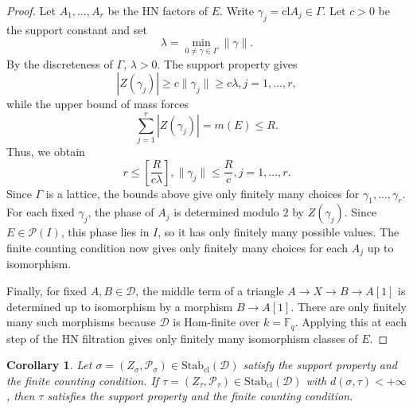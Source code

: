 \documentclass[a4paper,12pt]{amsart}
\numberwithin{equation}{section}
\newtheorem{corollary}[theorem]{Corollary}
\newcommand{\Stab}{\mathrm{Stab}}
\newcommand{\cl}{\mathrm{cl}}
\newcommand{\1}{\mathbf{1}}
\begin{document}
\begin{proof}
    Let $A_1,\dots,A_r$ be the HN factors of $E$. Write $\gamma_j=\cl A_j\in\Gamma$. Let $c>0$ be the support constant and set
    \[\lambda=\min_{0\neq\gamma\in\Gamma}\|\gamma\|.\]
    By the discreteness of $\Gamma$, $\lambda>0$. The support property gives
    \[|Z(\gamma_j)|\geqslant c\|\gamma_j\|\geqslant c\lambda,j=1,\dots,r,\]
    while the upper bound of mass forces
    \[\sum_{j=1}^r|Z(\gamma_j)|=m(E)\leqslant R.\]
    Thus, we obtain
    \[r\leqslant\left[\dfrac{R}{c\lambda}\right],\|\gamma_j\|\leqslant\dfrac{R}{c},j=1,\dots,r.\]
    Since $\Gamma$ is a lattice, the bounds above give only finitely many choices for $\gamma_1,\dots,\gamma_r$. For each fixed $\gamma_j$, the phase of $A_j$ is determined modulo $2$ by $Z(\gamma_j)$. Since $E\in\mathcal{P}(I)$, this phase lies in $I$, so it has only finitely many possible values. The finite counting condition now gives only finitely many choices for each $A_j$ up to isomorphism. 
    
    Finally, for fixed $A,B\in\mathcal{D}$, the middle term of a triangle $A\rightarrow X\rightarrow B\rightarrow A[1]$ is determined up to isomorphism by a morphism $B\rightarrow A[1]$. There are only finitely many such morphisms because $\mathcal{D}$ is Hom-finite over $k=\mathbb{F}_q$. Applying this at each step of the HN filtration gives only finitely many isomorphism classes of $E$.
\end{proof}
\begin{corollary}\label{finite distance}
    Let $\sigma=(Z_\sigma,\mathcal{P}_\sigma)\in\Stab_\cl(\mathcal{D})$ satisfy the support property and the finite counting condition. If $\tau=(Z_\tau,\mathcal{P}_\tau)\in\Stab_\cl(\mathcal{D})$ with $d(\sigma,\tau)<+\infty$, then $\tau$ satisfies the support property and the finite counting condition.
\end{corollary}
\end{document}
